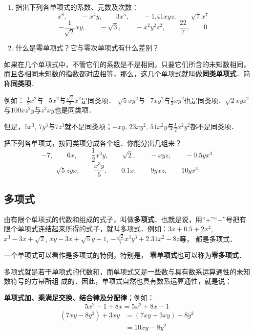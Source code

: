 \begin{ex}
  \begin{enumerate}
      \item 指出下列各单项式的系数、元数及次数：
      \[x^8,\qquad -x^4y,\qquad 3x^5,\qquad -1.41xyz, \qquad \sqrt{7}x^7 \]
      \[-\frac{1}{\sqrt{2}}xy,\qquad -\sqrt{3},\qquad -x^2y^2z^2,\qquad \frac{22}{7},\qquad 0 \]
      \item 什么是零单项式？它与零次单项式有什么差别？
  \end{enumerate} 
\end{ex}

如果在几个单项式中，不管它们的系数是不是相同，只要它们所含的未知数相同，而且各相同未知数的指数都对应相等，那么，这几个单项式就叫做\textbf{同类单项式}．简称\textbf{同类项}．

例如：
$\frac{1}{2}x^2$与$-5x^2$与$\frac{\sqrt{2}}{2}x^2$是同类项．
$\sqrt{5}xy^2$与$-7xy^2$与$\frac{1}{3}xy^2$也是同类项．$\sqrt{2}xyz^2$与$100xz^2y$与$z^2xy$也是同类项．

但是，$5x^3$, $7y^3$与$7z^3$就不是同类项；$-xy$,
$23xy^2$, $51x^2y$与$\frac{1}{2}x^2y^2$都不是同类项．

\begin{ex}
    把下列各单项式，按同类项分成各个组．你能分出几组来？
\[-7,\qquad  6x,\qquad \frac{1}{2}x^3y,\qquad \sqrt{2},\qquad -xyz,\qquad -0.5yx^3 \]
\[\sqrt{5}zyx,\qquad \frac{x^3y}{5},\qquad 0.1x,\qquad 9yxz,\qquad 10yx^3 \]
\end{ex}



\subsection{多项式}
由有限个单项式的代数和组成的式子，叫做\textbf{多项式}．也就是说，用“$+$”“$-$”号把有限个单项式连结起来所得的式子，就叫多项式．例如：$3x+0.5+2x^2$, $x^3-3x+\sqrt{2}$, $xy-3x+\sqrt{5}y+1$, $-\frac{\sqrt{2}}{7}x^3y^3+2.31x^2-8z$等，
都是多项式．

一个单项式可以看作是多项式的特例，特别是，
\textbf{零单项式}也可以称为\textbf{零多项式}．

多项式就是若干单项式的代数和，而单项式又是一些数与具有数系运算通性的未知数符号的方幂所组
成的．因此，单项式自然也具有数系运算通性，就是说：

\textbf{单项式加、乘满足交换、结合律及分配律}；例如：
\begin{equation*}
    5x^2-1+8x=5x^2+8x-1 \tag{交换律}
\end{equation*}
\begin{align*}
(7xy-8y^2)+3xy &=(7xy+3xy)-8y^2 \tag{交换律，结合律}\\
&=10xy-8y^2 \tag{分配律}
\end{align*}

